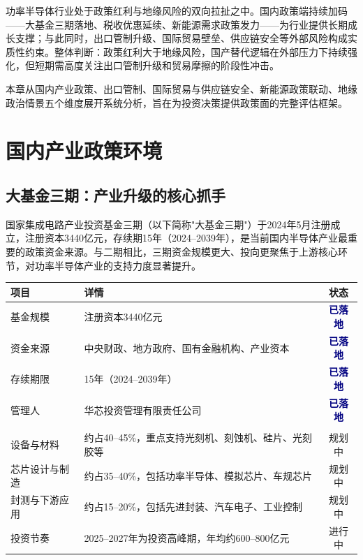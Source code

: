 
功率半导体行业处于政策红利与地缘风险的双向拉扯之中。国内政策端持续加码——大基金三期落地、税收优惠延续、新能源需求政策发力——为行业提供长期成长支撑；与此同时，出口管制升级、国际贸易壁垒、供应链安全等外部风险构成实质性约束。整体判断：政策红利大于地缘风险，国产替代逻辑在外部压力下持续强化，但短期需高度关注出口管制升级和贸易摩擦的阶段性冲击。

本章从国内产业政策、出口管制、国际贸易与供应链安全、新能源政策联动、地缘政治情景五个维度展开系统分析，旨在为投资决策提供政策面的完整评估框架。

\section{国内产业政策环境}

\subsection{大基金三期：产业升级的核心抓手}

国家集成电路产业投资基金三期（以下简称"大基金三期"）于2024年5月注册成立，注册资本3440亿元，存续期15年（2024--2039年），是当前国内半导体产业最重要的政策资金来源。与二期相比，三期资金规模更大、投向更聚焦于上游核心环节，对功率半导体产业的支持力度显著提升。

\begin{exhibitbox}[表 8-1：大基金三期概况与投资结构]
\centering
\small
\begin{tabularx}{\textwidth}{X L{5.5cm} c}
\toprule
\textbf{项目} & \textbf{详情} & \textbf{状态} \\
\midrule
基金规模 & 注册资本3440亿元 & \textcolor{navy}{\textbf{已落地}} \\
资金来源 & 中央财政、地方政府、国有金融机构、产业资本 & \textcolor{navy}{\textbf{已落地}} \\
存续期限 & 15年（2024--2039年） & \textcolor{navy}{\textbf{已落地}} \\
管理人 & 华芯投资管理有限责任公司 & \textcolor{navy}{\textbf{已落地}} \\
\midrule
{}
 \\
设备与材料 & 约占40--45\%，重点支持光刻机、刻蚀机、硅片、光刻胶等 & 规划中 \\
芯片设计与制造 & 约占35--40\%，包括功率半导体、模拟芯片、车规芯片 & 规划中 \\
封测与下游应用 & 约占15--20\%，包括先进封装、汽车电子、工业控制 & 规划中 \\
\midrule
投资节奏 & 2025--2027年为投资高峰期，年均约600--800亿元 & 进行中 \\
\bottomrule
\end{tabularx}
\end{exhibitbox}

